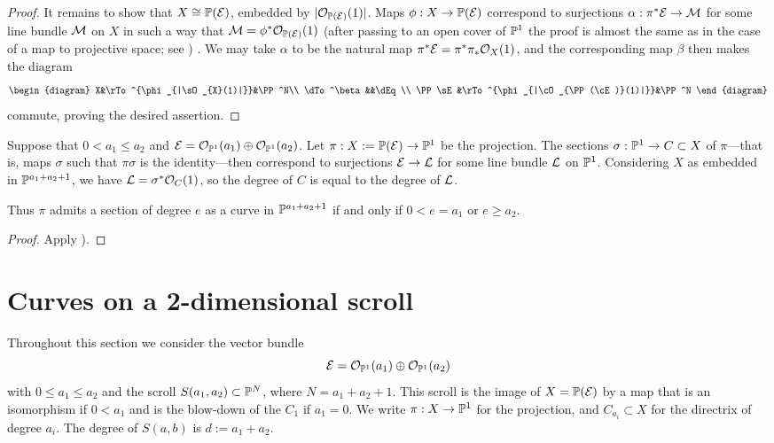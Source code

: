 \begin{proof}
It remains to show that $X \cong {\mathbb P}({\mathcal E})$, embedded by $|{\mathcal O}_{{\mathbb P}(\cal E)}(1)|$. Maps $\phi: X \to {\mathbb P} ({\mathcal E})$ correspond to surjections 
$\alpha: \pi^* {\mathcal E} \to {\mathcal M}$ for some line bundle ${\mathcal M}$ on $X$ in such a way that ${\mathcal M} = \phi^*{\mathcal O}_{{\mathbb P}({\mathcal E})}(1)$ (after passing to an open
cover of ${\mathbb P}^1$ the proof is almost the same as in the case of a map to projective space; see \cite[II.7.12]{Hartshorne1977}) . We may take $\alpha$ to be the 
natural map $\pi^*{\mathcal E} = \pi^*\pi_*{\mathcal O}_X(1)$, and the corresponding map $\beta$ then makes the diagram
$$
\begin{diagram}
 X&\rTo^{\phi_{|\sO_{X}(1)|}}&\PP^N\\
\dTo^\beta&&\dEq \\
\PP\sE &\rTo^{\phi_{|\cO_{\PP(\cE)}(1)|}}&\PP^N
\end{diagram}
$$
commute, proving the desired assertion.
\end{proof}
 
\begin{proposition} Suppose that $0<a_1\leq a_2$ and
${\mathcal E} = {\mathcal O}_{{\mathbb P}^1}(a_1)\oplus {\mathcal O}_{{\mathbb P}^1}(a_2)$. Let $\pi: X:= {\mathbb P}({\mathcal E}) \to {\mathbb P}^1$ be the projection.
The sections $\sigma:{\mathbb P}^1 \to C\subset X$ of $\pi$---that is, maps $\sigma$ such that $\pi\sigma$ is the identity---then 
correspond to surjections
${\mathcal E} \to {\mathcal L}$ for some line bundle ${\mathcal L}$ on ${\mathbb P}^1$. Considering  $X$ as embedded in 
${\mathbb P}^{a_1+a_2+1}$, we have ${\mathcal L} = \sigma^*{\mathcal O}_C(1)$, so the degree of $C$ is equal
to the degree of ${\mathcal L}$.

Thus $\pi$ admits a section of degree $e$ as a curve in ${\mathbb P}^{a_1+a_2+1}$ if and only if
$0<e = a_1$ or $e\geq a_2$.
\end{proposition}

\begin{proof}
Apply \cite[II.7.12]{Hartshorne1977}).
\end{proof}

\section{Curves on a 2-dimensional scroll}\label{curves on scrolls}

 Throughout this section we consider the vector bundle 
$$
{\mathcal E} = {\mathcal O}_{{\mathbb P}^1}(a_1) \oplus{\mathcal O}_{{\mathbb P}^1}(a_2)
$$
with $0\leq a_1\leq a_2$ and the 
scroll $ S(a_1, a_2) \subset {\mathbb P}^N$, where $N = a_1+a_2+1$. This scroll is the image of $X = {\mathbb P}({\mathcal E})$ by a map that is an isomorphism
if $0<a_1$ and is the blow-down of the $C_1$ if $a_1=0$.  We write $\pi:X \to {\mathbb P}^1$ for the projection, and
$C_{a_i}\subset X$ for the directrix of degree $a_i$. The degree of $S(a,b)$ is $d := a_1+a_2$.

